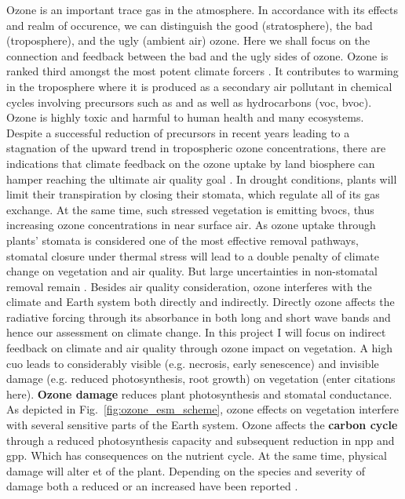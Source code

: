 Ozone is an important trace gas in the atmosphere. In accordance with its effects and realm of occurence, we can distinguish the good (stratosphere), the bad (troposphere), and the ugly (ambient air) ozone. Here we shall focus on the connection and feedback between the bad and the ugly sides of ozone. Ozone is ranked third amongst the most potent climate forcers \parencite[Chapter 8]{IPCC2013}. It contributes to warming in the troposphere where it is produced as a secondary air pollutant in chemical cycles involving precursors such as  and  as well as hydrocarbons (\gls{voc}, \gls{bvoc}). Ozone is highly toxic and harmful to human health and many ecosystems. Despite a successful reduction of precursors in recent years leading to a stagnation of the upward trend in tropospheric ozone concentrations, there are indications that climate feedback on the ozone uptake by land biosphere can hamper reaching the ultimate air quality goal \parencite{NCC:Lin2020}. In drought conditions, plants will limit their transpiration by closing their stomata, which regulate all of its gas exchange. At the same time, such stressed vegetation is emitting \glspl{bvoc}, thus increasing ozone concentrations \ch{[O_3]} in near surface air. As ozone uptake through plants’ stomata is considered one of the most effective removal pathways, stomatal closure under thermal stress will lead to a double penalty of climate change on vegetation and air quality. But large uncertainties in non-stomatal removal remain \parencite{RG:Clifton2020}.
Besides air quality consideration, ozone interferes with the climate and Earth system both directly and indirectly. Directly ozone affects the radiative forcing through its absorbance in both long and short wave bands and hence our assessment on climate change. In this project I will focus on indirect feedback on climate and air quality through ozone impact on vegetation. A high \gls{cuo} leads to considerably visible (e.g. necrosis, early senescence) and invisible damage (e.g. reduced photosynthesis, root growth) on vegetation (enter citations here). \textbf{Ozone damage} reduces plant photosynthesis and stomatal conductance. As depicted in Fig.~\ref{fig:ozone_esm_scheme}, ozone effects on vegetation interfere with several sensitive parts of the Earth system. Ozone affects the \textbf{carbon cycle} through a reduced photosynthesis capacity and subsequent reduction in \gls{npp} and \gls{gpp}. Which has consequences on the nutrient cycle. At the same time, physical damage will alter \gls{et} of the plant. Depending on the species and severity of damage both a reduced or an increased have been reported \parencite{SR:Hoshika2015}. 
